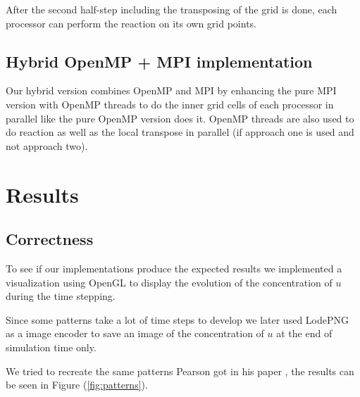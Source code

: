 \documentclass[11pt,a4paper]{article} %
\begin{document}
After the second half-step including the transposing of the grid is done, each processor can perform the reaction on its own grid points.

\subsection{Hybrid OpenMP + MPI implementation}

Our hybrid version combines OpenMP and MPI by enhancing the pure MPI version with OpenMP threads to do the inner grid cells of each processor in parallel like the pure OpenMP version does it.
OpenMP threads are also used to do reaction as well as the local transpose in parallel (if approach one is used and not approach two).

\section{Results}
\subsection{Correctness}

To see if our implementations produce the expected results we implemented a visualization using OpenGL to display the evolution of the concentration of $u$ during the time stepping. 

Since some patterns take a lot of time steps to develop we later used LodePNG \cite{lodepng} as a image encoder to save an image of the concentration of $u$ at the end of simulation time only.

We tried to recreate the same patterns Pearson  got in his paper \cite{Pearson_1993}, the results can be seen in Figure (\ref{fig:patterns}).
\end{document}
